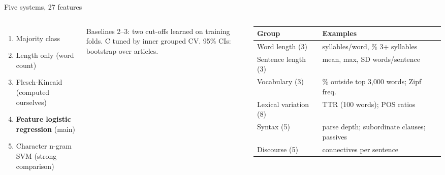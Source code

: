 \documentclass[aspectratio=169,11pt]{beamer}
\newcommand{\subtle}[1]{{\color{muted}\small #1}}
\begin{document}
\begin{frame}{Five systems, 27 features}
\begin{columns}[T]
\begin{enumerate}
\item Majority class
\item Length only (word count)
\item Flesch-Kincaid (computed ourselves)
\item \textbf{Feature logistic regression} \subtle{(main)}
\item Character n-gram SVM \subtle{(strong comparison)}
\end{enumerate}
\vspace{0.6em}
\subtle{Baselines 2--3: two cut-offs learned on training folds. C tuned by inner grouped CV. 95\% CIs: bootstrap over articles.}
\footnotesize
\begin{tabular}{@{}l>{\raggedright\arraybackslash}p{4.9cm}@{}}
\toprule
\textbf{Group} & \textbf{Examples} \\
\midrule
Word length (3) & syllables/word, \% 3+ syllables \\
Sentence length (3) & mean, max, SD words/sentence \\
Vocabulary (3) & \% outside top 3,000 words; Zipf freq. \\
Lexical variation (8) & TTR (100 words); POS ratios \\
Syntax (5) & parse depth; subordinate clauses; passives \\
Discourse (5) & connectives per sentence \\
\bottomrule
\end{tabular}
\end{columns}
\end{frame}
\end{document}
